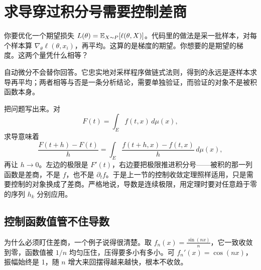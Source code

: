 \section{求导穿过积分号需要控制差商}
\label{sec:12-Real-Analysis-Support/04-Limits-and-Integration/03}

你要优化一个期望损失 \(L(\theta)=\mathbb{E}_{X\sim P}[\ell(\theta,X)]\)。代码里的做法是采一批样本，对每个样本算 \(\nabla_\theta\ell(\theta,x_i)\)，再平均。这算的是梯度的期望。你想要的是期望的梯度。这两个量凭什么相等？

自动微分不会替你回答。它忠实地对采样程序做链式法则，得到的永远是逐样本求导再平均；两者相等与否是一条分析结论，需要单独验证，而验证的对象不是被积函数本身。

把问题写出来。对
\[
F(t)=\int_E f(t,x)\,d\mu(x),
\]
求导意味着
\[
\frac{F(t+h)-F(t)}h=\int_E\frac{f(t+h,x)-f(t,x)}h\,d\mu(x),
\]
再让 \(h\to0\)。左边的极限是 \(F'(t)\)，右边要把极限推进积分号——被积的那一列函数是差商，不是 \(f\)，也不是 \(\partial_t f\)。于是上一节的控制收敛定理照样适用，只是需要控制的对象换成了差商。严格地说，导数是连续极限，用定理时要对任意趋于零的序列 \(h_k\) 分别应用。

\subsection{控制函数值管不住导数}

为什么必须盯住差商，一个例子说得很清楚。取 \(f_n(x)=\frac{\sin(nx)}n\)，它一致收敛到零，函数值被 \(1/n\) 均匀压住，压得要多小有多小。可 \(f_n'(x)=\cos(nx)\)，振幅始终是 1，随 \(n\) 增大来回摆得越来越快，根本不收敛。

\begin{center}
\end{center}

